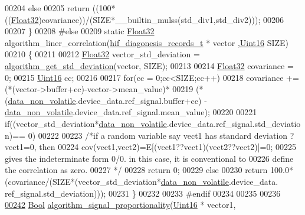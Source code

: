 \begin{DoxyCode}
00204     \textcolor{keywordflow}{else}
00205     \textcolor{keywordflow}{return} ((100*((\hyperlink{a00072_a87d38f886e617ced2698fc55afa07637}{Float32})covariance))/(SIZE*\_\_builtin\_mulss(std\_div1,std\_div2)));
00206 
00207 \}
00208 \textcolor{preprocessor}{#else}
00209 \textcolor{keyword}{static} \hyperlink{a00072_a87d38f886e617ced2698fc55afa07637}{Float32} algorithm\_liner\_correlation(\hyperlink{a00022_a4726b814166e222a6f13e21453f76d8d}{hif\_diagonesis\_records\_t} * vector
      ,\hyperlink{a00072_a59a9f6be4562c327cbfb4f7e8e18f08b}{Uint16} SIZE)
00210 \{
00211 
00212     \hyperlink{a00072_a87d38f886e617ced2698fc55afa07637}{Float32} vector\_std\_deviation    = \hyperlink{a00038_a97eb6437dda088f144d791e49cd3dc2a}{algorithm\_get\_std\_deviation}(vector,
      SIZE);
00213 
00214     \hyperlink{a00072_a87d38f886e617ced2698fc55afa07637}{Float32} covariance              = 0;
00215     \hyperlink{a00072_a59a9f6be4562c327cbfb4f7e8e18f08b}{Uint16} cc;
00216 
00217     \textcolor{keywordflow}{for}(cc = 0;cc<SIZE;cc++)
00218         covariance +=(*(vector->buffer+cc)-vector->mean\_value)*
00219                      (*(\hyperlink{a00060_a76ac5f917f5308dcd83de0d7c94559fb}{data\_non\_volatile}.device\_data.ref\_signal.buffer+cc) - 
      \hyperlink{a00060_a76ac5f917f5308dcd83de0d7c94559fb}{data\_non\_volatile}.device\_data.ref\_signal.mean\_value);
00220 
00221     \textcolor{keywordflow}{if}((vector\_std\_deviation*\hyperlink{a00060_a76ac5f917f5308dcd83de0d7c94559fb}{data\_non\_volatile}.device\_data.ref\_signal.std\_deviation)== 0)
00222 
00223     \textcolor{comment}{/*if a random variable say vect1 has standard deviation ?vect1=0, then}
00224 \textcolor{comment}{    cov(vect1,vect2)=E[(vect1??vect1)(vect2??vect2)]=0;}
00225 \textcolor{comment}{    gives the indeterminate form 0/0. in this case, it is conventional to}
00226 \textcolor{comment}{    define the correlation as zero.}
00227 \textcolor{comment}{     */}
00228     \textcolor{keywordflow}{return} 0;
00229     \textcolor{keywordflow}{else}
00230     \textcolor{keywordflow}{return} 100.0*(covariance/(SIZE*(vector\_std\_deviation*\hyperlink{a00060_a76ac5f917f5308dcd83de0d7c94559fb}{data\_non\_volatile}.device\_data.
      ref\_signal.std\_deviation)));
00231 \}
00232 
00233 \textcolor{preprocessor}{#endif}
00234 
00235 
00236 
\hypertarget{a00038_source_l00242}{}\hyperlink{a00038_a2925c58a9c3f5d3c957eaca9a95a6c3a}{00242} \hyperlink{a00072_a253b248072cfc8bd812c69acd0046eed}{Bool} \hyperlink{a00038_a2925c58a9c3f5d3c957eaca9a95a6c3a}{algorithm\_signal\_proportionality}(\hyperlink{a00072_a59a9f6be4562c327cbfb4f7e8e18f08b}{Uint16} * vector1,

\end{DoxyCode}
